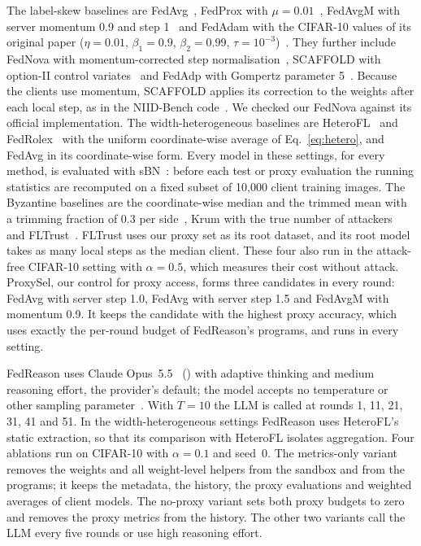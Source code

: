 \documentclass[3p,times,a4paper]{elsarticle}
\newcommand{\code}[1]{\texttt{\detokenize{#1}}}
\begin{document}
The label-skew baselines are FedAvg~\cite{mcmahan2017communication}, FedProx with $\mu=0.01$~\cite{li2020fedprox}, FedAvgM with server momentum 0.9 and step 1~\cite{hsu2019measuring} and FedAdam with the CIFAR-10 values of its original paper ($\eta=0.01$, $\beta_1=0.9$, $\beta_2=0.99$, $\tau=10^{-3}$)~\cite{reddi2021adaptive}. They further include FedNova with momentum-corrected step normalisation~\cite{wang2020tackling}, SCAFFOLD with option-II control variates~\cite{karimireddy2020scaffold} and FedAdp with Gompertz parameter 5~\cite{wu2021fedadp}. Because the clients use momentum, SCAFFOLD applies its correction to the weights after each local step, as in the NIID-Bench code~\cite{li2022niid}. We checked our FedNova against its official implementation. The width-heterogeneous baselines are HeteroFL~\cite{diao2021heterofl} and FedRolex~\cite{alam2022fedrolex} with the uniform coordinate-wise average of Eq.~\eqref{eq:hetero}, and FedAvg in its coordinate-wise form. Every model in these settings, for every method, is evaluated with sBN~\cite{diao2021heterofl}: before each test or proxy evaluation the running statistics are recomputed on a fixed subset of 10{,}000 client training images. The Byzantine baselines are the coordinate-wise median and the trimmed mean with a trimming fraction of 0.3 per side~\cite{yin2018byzantine}, Krum with the true number of attackers~\cite{blanchard2017krum} and FLTrust~\cite{cao2021fltrust}. FLTrust uses our proxy set as its root dataset, and its root model takes as many local steps as the median client. These four also run in the attack-free CIFAR-10 setting with $\alpha=0.5$, which measures their cost without attack. ProxySel, our control for proxy access, forms three candidates in every round: FedAvg with server step 1.0, FedAvg with server step 1.5 and FedAvgM with momentum 0.9. It keeps the candidate with the highest proxy accuracy, which uses exactly the per-round budget of FedReason's programs, and runs in every setting.

FedReason uses Claude Opus~5.5~\cite{anthropic2026opus55} (\code{claude-opus-5-5}) with adaptive thinking and medium reasoning effort, the provider's default; the model accepts no temperature or other sampling parameter~\cite{anthropic2026opus55docs}. With $T=10$ the LLM is called at rounds 1, 11, 21, 31, 41 and 51. In the width-heterogeneous settings FedReason uses HeteroFL's static extraction, so that its comparison with HeteroFL isolates aggregation. Four ablations run on CIFAR-10 with $\alpha=0.1$ and seed~0. The metrics-only variant removes the weights and all weight-level helpers from the sandbox and from the programs; it keeps the metadata, the history, the proxy evaluations and weighted averages of client models. The no-proxy variant sets both proxy budgets to zero and removes the proxy metrics from the history. The other two variants call the LLM every five rounds or use high reasoning effort.
\end{document}
